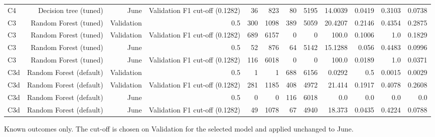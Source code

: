 \begin{table}[htbp]
\begin{tabular}{lrrrrrrrrrrr}
C4 & Decision tree (tuned) & June & Validation F1 cut-off (0.1282) & 36 & 823 & 80 & 5195 & 14.0039 & 0.0419 & 0.3103 & 0.0738 \\
C3 & Random Forest (tuned) & Validation & 0.5 & 300 & 1098 & 389 & 5059 & 20.4207 & 0.2146 & 0.4354 & 0.2875 \\
C3 & Random Forest (tuned) & Validation & Validation F1 cut-off (0.1282) & 689 & 6157 & 0 & 0 & 100.0 & 0.1006 & 1.0 & 0.1829 \\
C3 & Random Forest (tuned) & June & 0.5 & 52 & 876 & 64 & 5142 & 15.1288 & 0.056 & 0.4483 & 0.0996 \\
C3 & Random Forest (tuned) & June & Validation F1 cut-off (0.1282) & 116 & 6018 & 0 & 0 & 100.0 & 0.0189 & 1.0 & 0.0371 \\
C3d & Random Forest (default) & Validation & 0.5 & 1 & 1 & 688 & 6156 & 0.0292 & 0.5 & 0.0015 & 0.0029 \\
C3d & Random Forest (default) & Validation & Validation F1 cut-off (0.1282) & 281 & 1185 & 408 & 4972 & 21.414 & 0.1917 & 0.4078 & 0.2608 \\
C3d & Random Forest (default) & June & 0.5 & 0 & 0 & 116 & 6018 & 0.0 & 0.0 & 0.0 & 0.0 \\
C3d & Random Forest (default) & June & Validation F1 cut-off (0.1282) & 49 & 1078 & 67 & 4940 & 18.373 & 0.0435 & 0.4224 & 0.0788 \\
\bottomrule
\end{tabular}
\par\smallskip\begin{minipage}{\linewidth}\footnotesize Known outcomes only. The cut-off is chosen on Validation for the selected model and applied unchanged to June.\end{minipage}
\end{table}

